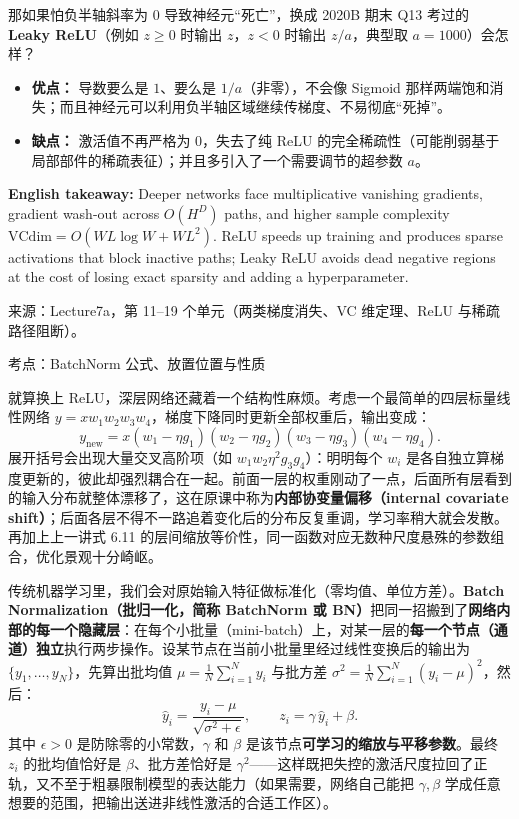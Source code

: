 那如果怕负半轴斜率为 0 导致神经元“死亡”，换成 2020B 期末 Q13 考过的 \textbf{Leaky ReLU}（例如 $z\ge 0$ 时输出 $z$，$z<0$ 时输出 $z/a$，典型取 $a=1000$）会怎样？
\begin{itemize}
\item \textbf{优点：} 导数要么是 $1$、要么是 $1/a$（非零），不会像 Sigmoid 那样两端饱和消失；而且神经元可以利用负半轴区域继续传梯度、不易彻底“死掉”。
\item \textbf{缺点：} 激活值不再严格为 0，失去了纯 ReLU 的完全稀疏性（可能削弱基于局部部件的稀疏表征）；并且多引入了一个需要调节的超参数 $a$。
\end{itemize}

\textbf{English takeaway:} Deeper networks face multiplicative vanishing gradients, gradient wash-out across $O(H^D)$ paths, and higher sample complexity $\mathrm{VCdim}=O(WL\log W + WL^2)$. ReLU speeds up training and produces sparse activations that block inactive paths; Leaky ReLU avoids dead negative regions at the cost of losing exact sparsity and adding a hyperparameter.

来源：Lecture7a，第 11–19 个单元（两类梯度消失、VC 维定理、ReLU 与稀疏路径阻断）。



考点：BatchNorm 公式、放置位置与性质 

就算换上 ReLU，深层网络还藏着一个结构性麻烦。考虑一个最简单的四层标量线性网络 $y = x w_1 w_2 w_3 w_4$，梯度下降同时更新全部权重后，输出变成：
\[
y_{\text{new}} = x (w_1 - \eta g_1)(w_2 - \eta g_2)(w_3 - \eta g_3)(w_4 - \eta g_4).
\tag{7.3}
\]
展开括号会出现大量交叉高阶项（如 $w_1 w_2 \eta^2 g_3 g_4$）：明明每个 $w_i$ 是各自独立算梯度更新的，彼此却强烈耦合在一起。前面一层的权重刚动了一点，后面所有层看到的输入分布就整体漂移了，这在原课中称为\textbf{内部协变量偏移（internal covariate shift）}；后面各层不得不一路追着变化后的分布反复重调，学习率稍大就会发散。再加上上一讲式 6.11 的层间缩放等价性，同一函数对应无数种尺度悬殊的参数组合，优化景观十分崎岖。

传统机器学习里，我们会对原始输入特征做标准化（零均值、单位方差）。\textbf{Batch Normalization（批归一化，简称 BatchNorm 或 BN）}把同一招搬到了\textbf{网络内部的每一个隐藏层}：在每个小批量（mini-batch）上，对某一层的\textbf{每一个节点（通道）独立}执行两步操作。设某节点在当前小批量里经过线性变换后的输出为 $\{y_1,\dots,y_N\}$，先算出批均值 $\mu = \frac{1}{N}\sum_{i=1}^N y_i$ 与批方差 $\sigma^2 = \frac{1}{N}\sum_{i=1}^N (y_i - \mu)^2$，然后：
\[
\hat{y}_i = \frac{y_i - \mu}{\sqrt{\sigma^2 + \epsilon}}, \qquad z_i = \gamma\,\hat{y}_i + \beta.
\tag{7.4}
\]
其中 $\epsilon > 0$ 是防除零的小常数，$\gamma$ 和 $\beta$ 是该节点\textbf{可学习的缩放与平移参数}。最终 $z_i$ 的批均值恰好是 $\beta$、批方差恰好是 $\gamma^2$——这样既把失控的激活尺度拉回了正轨，又不至于粗暴限制模型的表达能力（如果需要，网络自己能把 $\gamma,\beta$ 学成任意想要的范围，把输出送进非线性激活的合适工作区）。

